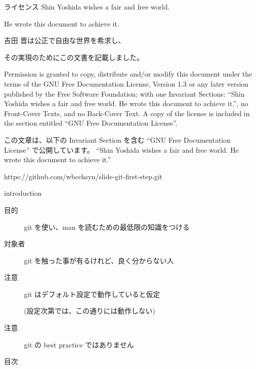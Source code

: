 
\begin{frame}{}{}
  \titlepage
\end{frame}

\begin{frame}{ライセンス}{}
Shin Yoshida wishes a fair and free world.

He wrote this document to achieve it.

\vspace{2ex}

吉田 晋は公正で自由な世界を希求し、

その実現のためにこの文書を記載しました。

\vspace{2ex}

{\tiny
Permission is granted to copy, distribute and/or modify this
document under the terms of the GNU Free Documentation License,
Version 1.3 or any later version published by the Free Software
Foundation; with one Invariant Sections: ``Shin Yoshida wishes
a fair and free world. He wrote this document to achieve it.'',
no Front-Cover Texts, and no Back-Cover Text. A copy of the license is
included in the section entitled ``GNU Free Documentation License''.

\vspace{2ex}

この文章は、以下の Invariant Section を含む ``GNU Free Documentation License''
で公開しています。
``Shin Yoshida wishes a fair and free world. He wrote this document to achieve it.''

\vspace{2ex}

https://github.com/wbcchsyn/slide-git-first-step.git
}
\end{frame}

\begin{frame}{introduction}{}

  \begin{description}

  \item[目的] git を使い、man を読むための最低限の知識をつける
  \item[対象者] git を触った事が有るけれど、良く分からない人
  \item[注意] git はデフォルト設定で動作していると仮定

    (設定次第では、この通りには動作しない)
  \item[注意] \alert{git の best practice ではありません}

  \end{description}

\end{frame}

\begin{frame}{目次}{}
  \tableofcontents
\end{frame}

